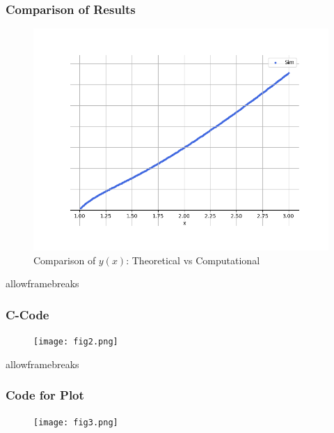 \documentclass{beamer}
\begin{document}
\begin{frame}
\frametitle{Comparison of Results}
\begin{figure}[h!]
    \centering
    \includegraphics[width=\columnwidth]{figs/fig1.png} %
    \caption{Comparison of $y(x)$: Theoretical vs Computational}
    \label{comparison}
\end{figure}
\end{frame}

\begin{frame}{allowframebreaks}
\frametitle{C-Code}
\begin{figure}[ht]
    \centering
    \texttt{[image: fig2.png]} %
\end{figure}
\end{frame}

\begin{frame}{allowframebreaks}
\frametitle{Code for Plot}
\begin{figure}[ht]
    \centering
    \texttt{[image: fig3.png]} %
\end{figure}
\end{frame}
\end{document}
